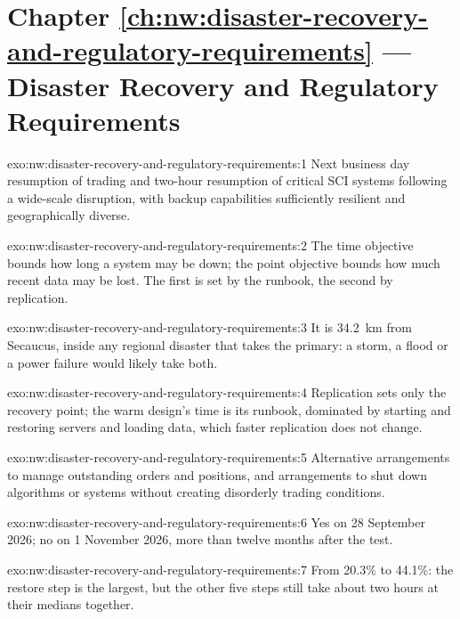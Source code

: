 \section*{Chapter \ref{ch:nw:disaster-recovery-and-regulatory-requirements} --- Disaster Recovery and Regulatory Requirements}

\begin{solution}{exo:nw:disaster-recovery-and-regulatory-requirements:1}
Next business day resumption of trading and two-hour resumption of critical SCI systems following a wide-scale disruption, with backup
capabilities sufficiently resilient and geographically diverse.
\end{solution}

\begin{solution}{exo:nw:disaster-recovery-and-regulatory-requirements:2}
The time objective bounds how long a system may be down; the point objective bounds how much recent data may be lost. The first is set
by the runbook, the second by replication.
\end{solution}

\begin{solution}{exo:nw:disaster-recovery-and-regulatory-requirements:3}
It is \qty{34.2}{\kilo\metre} from Secaucus, inside any regional disaster that takes the primary: a storm, a flood or a power failure
would likely take both.
\end{solution}

\begin{solution}{exo:nw:disaster-recovery-and-regulatory-requirements:4}
Replication sets only the recovery point; the warm design's time is its runbook, dominated by starting and restoring servers and loading
data, which faster replication does not change.
\end{solution}

\begin{solution}{exo:nw:disaster-recovery-and-regulatory-requirements:5}
Alternative arrangements to manage outstanding orders and positions, and arrangements to shut down algorithms or systems without creating
disorderly trading conditions.
\end{solution}

\begin{solution}{exo:nw:disaster-recovery-and-regulatory-requirements:6}
Yes on 28 September 2026; no on 1 November 2026, more than twelve months after the test.
\end{solution}

\begin{solution}{exo:nw:disaster-recovery-and-regulatory-requirements:7}
From 20.3\% to 44.1\%: the restore step is the largest, but the other five steps still take about two hours at their medians together.
\end{solution}

